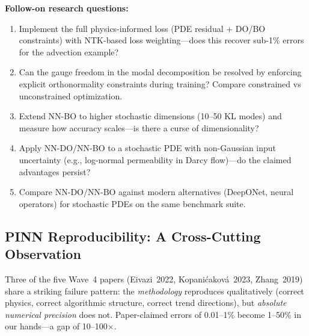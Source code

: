 \documentclass[11pt]{article}
\begin{document}
\noindent\textbf{Follow-on research questions:}
\begin{enumerate}[leftmargin=1.6em,itemsep=0.2em,topsep=0.2em,label=Q\arabic*.]
\item Implement the full physics-informed loss (PDE residual + DO/BO constraints) with NTK-based loss weighting---does this recover sub-1\% errors for the advection example?
\item Can the gauge freedom in the modal decomposition be resolved by enforcing explicit orthonormality constraints during training? Compare constrained vs unconstrained optimization.
\item Extend NN-BO to higher stochastic dimensions (10--50 KL modes) and measure how accuracy scales---is there a curse of dimensionality?
\item Apply NN-DO/NN-BO to a stochastic PDE with non-Gaussian input uncertainty (e.g., log-normal permeability in Darcy flow)---do the claimed advantages persist?
\item Compare NN-DO/NN-BO against modern alternatives (DeepONet, neural operators) for stochastic PDEs on the same benchmark suite.
\end{enumerate}

\subsection{PINN Reproducibility: A Cross-Cutting Observation}\label{sec:pinn-repro}

Three of the five Wave~4 papers (Eivazi~2022, Kopani\'cakov\'a~2023,
Zhang~2019) share a striking failure pattern: the \emph{methodology}
reproduces qualitatively (correct physics, correct algorithmic structure,
correct trend directions), but \emph{absolute numerical precision} does not.
Paper-claimed errors of 0.01--1\% become 1--50\% in our hands---a gap of
10--100$\times$.
\end{document}
